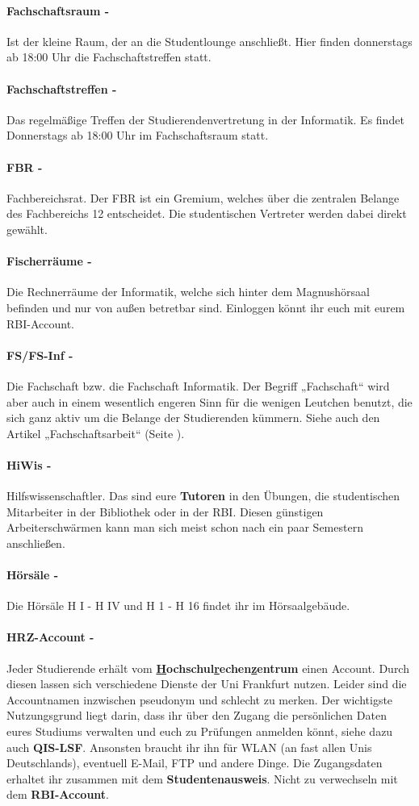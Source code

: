 \paragraph{Fachschaftsraum -} Ist der kleine Raum, der an die Studentlounge anschließt. Hier finden donnerstags ab 18:00 Uhr die Fachschaftstreffen statt.
\paragraph{Fachschaftstreffen -} Das regelmäßige Treffen der Studierendenvertretung in der Informatik. Es findet Donnerstags ab 18:00 Uhr im Fachschaftsraum statt.
\paragraph{FBR -} \glqq Fachbereichsrat\grqq. Der FBR ist ein Gremium, welches über die zentralen Belange des Fachbereichs 12 entscheidet. Die studentischen Vertreter werden dabei direkt gewählt.
\paragraph{Fischerräume -} Die Rechnerräume der Informatik, welche sich hinter dem Magnushörsaal befinden und nur von außen betretbar sind. Einloggen könnt ihr euch mit eurem RBI-Account.
\paragraph{FS/FS-Inf -} Die Fachschaft bzw. die Fachschaft Informatik. Der Begriff „Fachschaft“ wird aber auch in einem wesentlich engeren Sinn für die wenigen Leutchen benutzt, die sich ganz aktiv um die Belange der Studierenden kümmern. Siehe auch den Artikel „Fachschaftsarbeit“ (Seite \pageref{fachschaftsarbeit}).
\paragraph{HiWis -} Hilfswissenschaftler. Das sind eure \textbf{Tutoren} in den Übungen, die studentischen Mitarbeiter in der Bibliothek oder in der RBI. Diesen günstigen Arbeiterschwärmen kann man sich meist schon nach ein paar Semestern anschließen.
\paragraph{Hörsäle -} Die Hörsäle H I - H IV und H 1 - H 16 findet ihr im Hörsaalgebäude.
\paragraph{HRZ-Account -} Jeder Studierende erhält vom \textbf{\underline{H}ochschul\underline{r}echen\underline{z}entrum} einen Account. Durch diesen lassen sich verschiedene Dienste der Uni Frankfurt nutzen. Leider sind die Accountnamen inzwischen pseudonym und schlecht zu merken. Der wichtigste Nutzungsgrund liegt darin, dass ihr über den Zugang die persönlichen Daten eures Studiums verwalten und euch zu Prüfungen anmelden könnt, siehe dazu auch \textbf{QIS-LSF}. Ansonsten braucht ihr ihn für WLAN (an fast allen Unis Deutschlands), eventuell E-Mail, FTP und andere Dinge. Die Zugangsdaten erhaltet ihr zusammen mit dem \textbf{Studentenausweis}. Nicht zu verwechseln mit dem \textbf{RBI-Account}.
